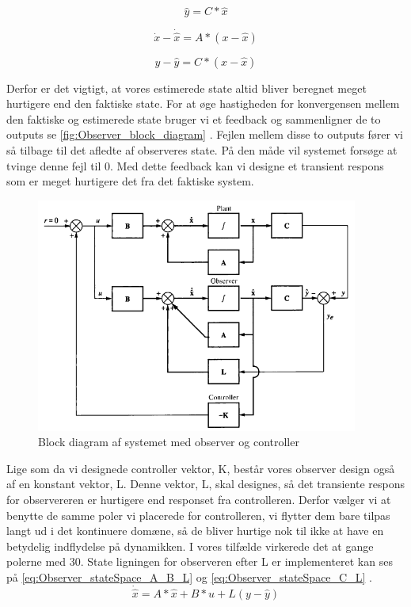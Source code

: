 \begin{equation}
\hat{y} = C * \hat{x}
\label{eq:Observer_stateSpace_C}
\end{equation}

\begin{equation}
\dot{x} - \dot{\hat{x}} = A * (x -\hat{x})
\label{eq:Subtraktion_A}
\end{equation}

\begin{equation}
y -\hat{y} = C * (x - \hat{x})
\label{eq:Subtraktion_C}
\end{equation}

Derfor er det vigtigt, at vores estimerede state altid bliver beregnet meget hurtigere end den faktiske state. For at øge hastigheden for konvergensen mellem den faktiske og estimerede state bruger vi et feedback og sammenligner de to outputs se \autoref{fig:Observer_block_diagram} . Fejlen mellem disse to outputs fører vi så tilbage til det afledte af observeres state. På den måde vil systemet forsøge at tvinge denne fejl til 0. Med dette feedback kan vi designe et transient respons som er meget hurtigere det fra det faktiske system. 

\begin{figure}[H]
	\centering
	\includegraphics[width = 300pt]{Img/Observer_block_diagram.png}
	\caption{Block diagram af systemet med observer og controller}
	\label{fig:Observer_block_diagram}
\end{figure}

Lige som da vi designede controller vektor, K, består vores observer design også af en konstant vektor, L. Denne vektor, L, skal designes, så det transiente respons for observereren er hurtigere end responset fra controlleren. Derfor vælger vi at benytte de samme poler vi placerede for controlleren, vi flytter dem bare tilpas langt ud i det kontinuere domæne, så de bliver hurtige nok til ikke at have en betydelig indflydelse på dynamikken. I vores tilfælde virkerede det at gange polerne med 30. State ligningen for observeren efter L er implementeret kan ses på \autoref{eq:Observer_stateSpace_A_B_L} og \autoref{eq:Observer_stateSpace_C_L} . 
\begin{equation}
\dot{\hat{x}} = A * \hat{x} + B * u + L(y - \hat{y})
\label{eq:Observer_stateSpace_A_B_L}
\end{equation}

